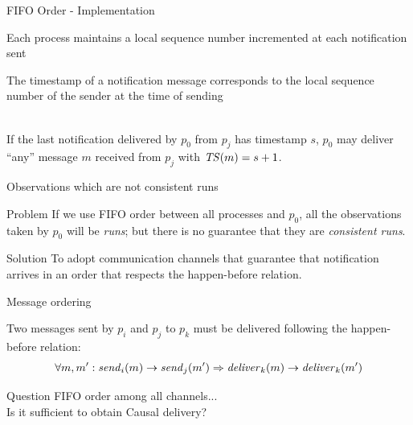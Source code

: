 \begin{frame}{FIFO Order - Implementation} 
	
\BI
\item Each process maintains a \alert{local sequence number} incremented at
  each notification sent
\item The timestamp of a notification message corresponds to the local sequence number
  of the sender at the time of sending
\EI

\begin{definition}~\\
  If the last notification delivered by $p_0$ from $p_j$ has timestamp
  $s$, $p_0$ may deliver ``any'' message $m$ received from $p_j$ with $\mathit{TS}(m)=s+1$.
\end{definition}

\end{frame}



\begin{frame}{Observations which are not consistent runs}

\begin{block}{Problem} 
If we use FIFO order between all processes and $p_0$, all the observations taken by $p_0$ will be \emph{runs};
but there is no guarantee that they are \emph{consistent runs}.
\end{block}

\pause
\bigskip
\begin{block}{Solution}
To adopt communication channels that guarantee that notification arrives
in an order that respects the happen-before relation.
\end{block}

\end{frame}

\begin{frame}{Message ordering}

\begin{definition}
Two messages sent by $p_i$ and $p_j$ to $p_k$ must be delivered following
the happen-before relation:
\[
\forall m,m': \mathit{send}_i(m) \rightarrow \mathit{send}_j(m') \Rightarrow \mathit{deliver}_k(m) \rightarrow \mathit{deliver}_k(m')
\]
\end{definition}

\bigskip
\begin{block}{Question}
 FIFO order among all channels...\\
 Is it sufficient to obtain Causal delivery?
\end{block}

\end{frame}


